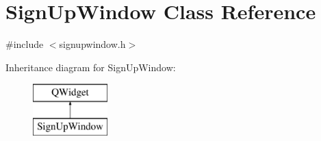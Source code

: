 \hypertarget{class_sign_up_window}{}\section{Sign\+Up\+Window Class Reference}
\label{class_sign_up_window}


{\ttfamily \#include $<$signupwindow.\+h$>$}

Inheritance diagram for Sign\+Up\+Window\+:\begin{figure}[H]
\begin{center}
\leavevmode
\includegraphics[height=2.000000cm]{class_sign_up_window}
\end{center}
\end{figure}
